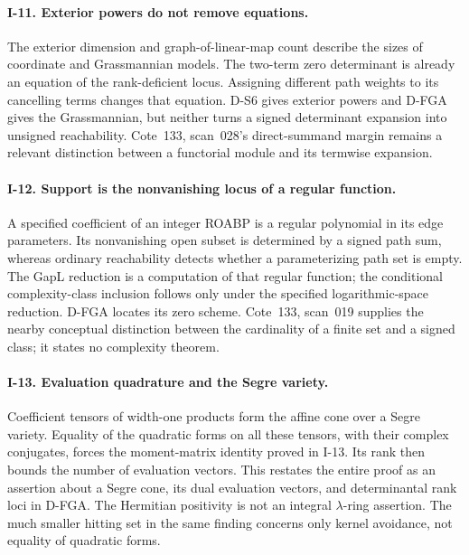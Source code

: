 \documentclass[11pt,a4paper]{article}
\theoremstyle{definition}\newtheorem{definition}{Definition}
\begin{document}
\paragraph{I-11. Exterior powers do not remove equations.}
The exterior dimension and graph-of-linear-map count describe the sizes of coordinate and Grassmannian models. The two-term zero determinant is already an equation of the rank-deficient locus. Assigning different path weights to its cancelling terms changes that equation. D-S6 gives exterior powers and D-FGA gives the Grassmannian, but neither turns a signed determinant expansion into unsigned reachability. Cote~133, scan~028's direct-summand margin remains a relevant distinction between a functorial module and its termwise expansion.

\paragraph{I-12. Support is the nonvanishing locus of a regular function.}
A specified coefficient of an integer ROABP is a regular polynomial in its edge parameters. Its nonvanishing open subset is determined by a signed path sum, whereas ordinary reachability detects whether a parameterizing path set is empty. The GapL reduction is a computation of that regular function; the conditional complexity-class inclusion follows only under the specified logarithmic-space reduction. D-FGA locates its zero scheme. Cote~133, scan~019 supplies the nearby conceptual distinction between the cardinality of a finite set and a signed class; it states no complexity theorem.

\paragraph{I-13. Evaluation quadrature and the Segre variety.}
Coefficient tensors of width-one products form the affine cone over a Segre variety. Equality of the quadratic forms on all these tensors, with their complex conjugates, forces the moment-matrix identity proved in I-13. Its rank then bounds the number of evaluation vectors. This restates the entire proof as an assertion about a Segre cone, its dual evaluation vectors, and determinantal rank loci in D-FGA. The Hermitian positivity is not an integral $\lambda$-ring assertion. The much smaller hitting set in the same finding concerns only kernel avoidance, not equality of quadratic forms.
\end{document}
